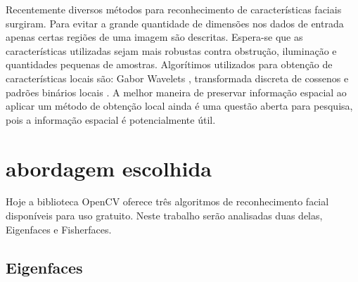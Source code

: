 Recentemente diversos métodos para reconhecimento de características faciais surgiram. Para evitar a grande quantidade de dimensões nos dados de entrada apenas certas regiões de uma imagem são descritas. Espera-se que as características utilizadas sejam mais robustas contra obstrução, iluminação e quantidades pequenas de amostras. Algorítimos utilizados para obtenção de características locais são: Gabor Wavelets \cite{wiskott1997face}, transformada discreta de cossenos \cite{messer2006performance} e padrões binários locais \cite{binaryface}. A melhor maneira de preservar informação espacial ao aplicar um método de obtenção local ainda é uma questão aberta para pesquisa, pois a informação espacial é potencialmente útil.

\section*{abordagem escolhida}

Hoje a biblioteca OpenCV oferece três algoritmos de reconhecimento facial disponíveis para uso gratuito. Neste trabalho serão analisadas duas delas, Eigenfaces e Fisherfaces.
\subsection*{Eigenfaces} %
\label{sub:eigenfaces}

